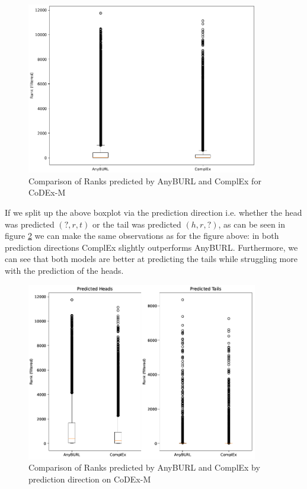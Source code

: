 \begin{figure}[H]
\centering
\includegraphics[width=0.9\textwidth]{images/ranks_anyburl_complex_codex.png}
\caption{Comparison of Ranks predicted by AnyBURL and ComplEx for CoDEx-M}
\label{fig:ranks_anyburl_complex_codex}
\end{figure}

If we split up the above boxplot via the prediction direction i.e. whether the head was predicted $(?,r,t)$ or the tail was predicted $(h,r,?)$, as can be seen in figure \ref{fig:ranks_head_tail_anyburl_complex_codex} we can make the same observations as for the figure above: in both prediction directions ComplEx slightly outperforms AnyBURL. Furthermore, we can see that both models are better at predicting the tails while struggling more with the prediction of the heads. 

\begin{figure}[H]
\centering
\includegraphics[width=0.9\textwidth]{images/ranks_head_tail_anyburl_complex_codex.png}
\caption{Comparison of Ranks predicted by AnyBURL and ComplEx by prediction direction on CoDEx-M}
\label{fig:ranks_head_tail_anyburl_complex_codex}
\end{figure}

